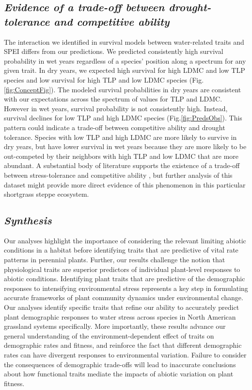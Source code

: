 \documentclass[12pt, letterpaper]{article}
\begin{document}
\subsection{\textit{Evidence of a trade-off between drought-tolerance and competitive ability}} The interaction we identified in survival models between water-related traits and SPEI differs from our predictions. We predicted consistently high survival probability in wet years regardless of a species' position along a spectrum for any given trait. In dry years, we expected high survival for high LDMC and low TLP species and low survival for high TLP and low LDMC species (Fig.\ref{fig:ConceptFig}). The modeled survival probabilities in dry years are consistent with our expectations across the spectrum of values for TLP and LDMC. However in wet years, survival probability is not consistently high. Instead, survival declines for low TLP and high LDMC species (Fig.\ref{fig:PredsObs}). This pattern could indicate a trade-off between competitive ability and drought tolerance. Species with low TLP and high LDMC are more likely to survive in dry years, but have lower survival in wet years because they are more likely to be out-competed by their neighbors with high TLP and low LDMC that are more abundant. A substantial body of literature supports the existence of a trade-off between stress-tolerance and competitive ability \citep{Grime1979, Grime1997, Craine2007, Volaire2018}, but further analysis of this dataset might provide more direct evidence of this phenomenon in this particular shortgrass steppe ecosystem. 

\subsection{\textit{Synthesis}} Our analyses highlight the importance of considering the relevant limiting abiotic conditions in a habitat before identifying traits that are predictive of vital rate patterns in perennial plants. Further, our results challenge the notion that physiological traits are superior predictors of individual plant-level responses to abiotic conditions. Identifying plant traits that are predictive of the demographic responses to intensifying environmental stress represents a key step in formulating accurate frameworks of plant community dynamics under environmental change. Our analyses identify specific traits that refine our ability to accurately predict plant demographic responses to water stress across species in North American grassland systems specifically. More importantly, these results advance our general understanding of the environment-dependent effect of traits on demographic rates and fitness, and reinforce the fact that different demographic rates can have divergent responses to environmental variation. Failure to consider the consequences of demographic trade-offs will lead to inaccurate conclusions about how functional traits mediate the impacts of abiotic variation on plant fitness. 
\end{document}
